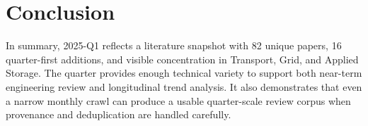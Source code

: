 \documentclass[conference]{IEEEtran}
\begin{document}
\section{Conclusion}
In summary, 2025-Q1 reflects a literature snapshot with 82 unique papers, 16 quarter-first additions, and visible concentration in Transport, Grid, and Applied Storage. The quarter provides enough technical variety to support both near-term engineering review and longitudinal trend analysis. It also demonstrates that even a narrow monthly crawl can produce a usable quarter-scale review corpus when provenance and deduplication are handled carefully.



\end{document}
